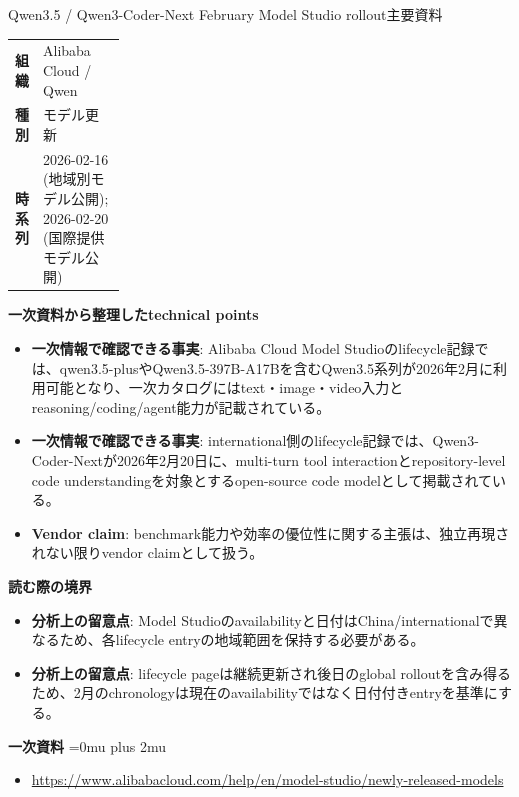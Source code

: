 \begin{technicalnote}{Qwen3.5 / Qwen3-Coder-Next February Model Studio rollout}{主要資料}
\begingroup
\begin{tabularx}{\linewidth}{@{}>{\bfseries}p{0.22\linewidth}X@{}}
組織 & Alibaba Cloud / Qwen \\
種別 & モデル更新 \\
時系列 & 2026-02-16 (地域別モデル公開); 2026-02-20 (国際提供モデル公開) \\
\end{tabularx}
\smallskip
{\bfseries 一次資料から整理したtechnical points}
\begin{itemize}[leftmargin=1.5em,itemsep=0.35em]
\item \textbf{一次情報で確認できる事実}: Alibaba Cloud Model Studioのlifecycle記録では、qwen3.5-plusやQwen3.5-397B-A17Bを含むQwen3.5系列が2026年2月に利用可能となり、一次カタログにはtext・image・video入力とreasoning/coding/agent能力が記載されている。
\item \textbf{一次情報で確認できる事実}: international側のlifecycle記録では、Qwen3-Coder-Nextが2026年2月20日に、multi-turn tool interactionとrepository-level code understandingを対象とするopen-source code modelとして掲載されている。
\item \textbf{Vendor claim}: benchmark能力や効率の優位性に関する主張は、独立再現されない限りvendor claimとして扱う。
\end{itemize}
\begin{minipage}{\linewidth}
{\bfseries 読む際の境界}
\begin{itemize}[leftmargin=1.5em,itemsep=0.35em]
\item \textbf{分析上の留意点}: Model Studioのavailabilityと日付はChina/internationalで異なるため、各lifecycle entryの地域範囲を保持する必要がある。
\item \textbf{分析上の留意点}: lifecycle pageは継続更新され後日のglobal rolloutを含み得るため、2月のchronologyは現在のavailabilityではなく日付付きentryを基準にする。
\end{itemize}
\begin{samepage}
{\bfseries 一次資料}
\begingroup\sloppy
\Urlmuskip=0mu plus 2mu\relax
\begin{itemize}[leftmargin=1.5em,itemsep=0.25em]
\item {\scriptsize\url{https://www.alibabacloud.com/help/en/model-studio/newly-released-models}}
\end{itemize}
\endgroup
\end{samepage}
\end{minipage}
\endgroup
\end{technicalnote}
\medskip

